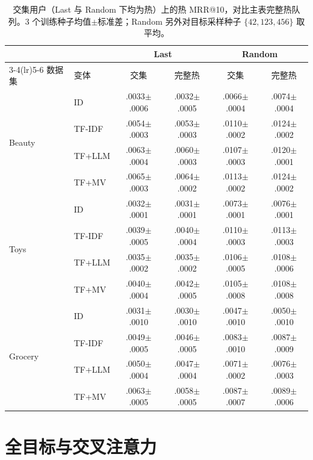\documentclass[sigconf,natbib=true,anonymous]{acmart}
\newcommand{\tfidf}{\textsc{TF-IDF}\xspace}
\newcommand{\tfllm}{\textsc{TF+LLM}\xspace}
\newcommand{\tfmv}{\textsc{TF+MV}\xspace}
\begin{document}
\begin{table}[h]
\centering
\caption{交集用户（Last 与 Random 下均为热）上的热 MRR@10，对比主表完整热队列。3 个训练种子均值$\pm$标准差；Random 另外对目标采样种子 $\{42,123,456\}$ 取平均。}
\label{tab:intersection}
\small
\setlength{\tabcolsep}{3pt}
\begin{tabular}{@{}llcccc@{}}
\toprule
& & \multicolumn{2}{c}{Last} & \multicolumn{2}{c}{Random} \\
\cmidrule(lr){3-4}\cmidrule(lr){5-6}
数据集 & 变体 & 交集 & 完整热 & 交集 & 完整热 \\
\midrule
\multirow{4}{*}{Beauty}
 & ID     & .0033$\pm$.0006 & .0032$\pm$.0005 & .0066$\pm$.0004 & .0074$\pm$.0004 \\
 & \tfidf & .0054$\pm$.0003 & .0053$\pm$.0003 & .0110$\pm$.0002 & .0124$\pm$.0002 \\
 & \tfllm & .0063$\pm$.0004 & .0060$\pm$.0003 & .0107$\pm$.0003 & .0120$\pm$.0001 \\
 & \tfmv  & .0065$\pm$.0003 & .0064$\pm$.0002 & .0113$\pm$.0002 & .0124$\pm$.0002 \\
\midrule
\multirow{4}{*}{Toys}
 & ID     & .0032$\pm$.0001 & .0031$\pm$.0001 & .0073$\pm$.0001 & .0076$\pm$.0001 \\
 & \tfidf & .0039$\pm$.0005 & .0040$\pm$.0004 & .0110$\pm$.0003 & .0113$\pm$.0003 \\
 & \tfllm & .0035$\pm$.0002 & .0035$\pm$.0002 & .0106$\pm$.0005 & .0108$\pm$.0006 \\
 & \tfmv  & .0040$\pm$.0004 & .0042$\pm$.0005 & .0105$\pm$.0008 & .0108$\pm$.0008 \\
\midrule
\multirow{4}{*}{Grocery}
 & ID     & .0031$\pm$.0010 & .0030$\pm$.0010 & .0047$\pm$.0010 & .0050$\pm$.0010 \\
 & \tfidf & .0049$\pm$.0005 & .0046$\pm$.0005 & .0083$\pm$.0010 & .0087$\pm$.0009 \\
 & \tfllm & .0050$\pm$.0004 & .0047$\pm$.0004 & .0071$\pm$.0002 & .0076$\pm$.0003 \\
 & \tfmv  & .0063$\pm$.0005 & .0058$\pm$.0005 & .0087$\pm$.0007 & .0089$\pm$.0006 \\
\bottomrule
\end{tabular}
\end{table}

\section{全目标与交叉注意力}
\label{app:alltarget}
\end{document}

